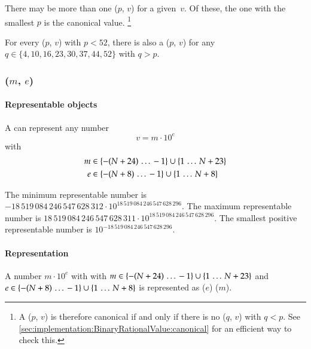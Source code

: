 There may be more than one \DborBinaryRationalValue($p$, $v$) for a given~$v$.
Of these, the one with the smallest $p$ is the canonical value.%
\footnote{
    A \DborBinaryRationalValue($p$, $v$) is therefore canonical if and only if there is
    no \DborBinaryRationalValue($q$, $v$) with $q < p$.
    See \ref{sec:implementation:BinaryRationalValue:canonical} for an efficient way to check this.
}

For every \DborBinaryRationalValue($p$, $v$) with $p < 52$, there is also
a \DborBinaryRationalValue($p$, $v$) for any
$q \in \{4, 10, 16, 23, 30, 37, 44, 52\}$ with $q > p$.


\subsubsection{\DborDecimalRationalValue(\texorpdfstring{$m$, $e$}{m, e})}
\hypertarget{sec:def:DecimalRationalValue}{}

\paragraph{Representable objects}

A \DborDecimalRationalValue{} can represent any number
\begin{equation}
    v = m \cdot 10^e
\end{equation}
with
\begin{align*}
    m & \in \{-(N + 24) \,\ldots\, -1\} \cup \{1 \,\ldots\, N + 23\} \\
    e & \in \{-(N + 8) \,\ldots\, -1\} \cup \{1 \,\ldots\, N + 8\}
\end{align*}

\smallskip
The minimum representable number is $-18\,519\,084\,246\,547\,628\,312 \cdot 10^{18\,519\,084\,246\,547\,628\,296}$.
The maximum representable number is $18\,519\,084\,246\,547\,628\,311 \cdot 10^{18\,519\,084\,246\,547\,628\,296}$.
The smallest positive representable number is $10^{-18\,519\,084\,246\,547\,628\,296}$.

\paragraph{Representation}

A number $m \cdot 10^e$ with with $m \in \{-(N + 24) \,\ldots\, -1\} \cup \{1 \,\ldots\, N + 23\}$
and $e \in \{-(N + 8) \,\ldots\, -1\} \cup \{1 \,\ldots\, N + 8\}$
is represented as \DborPowerOfTenToken*($e$) {\Concat} \DborIntegerValue*($m$).

